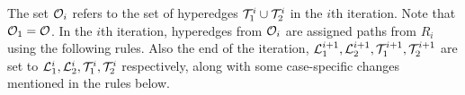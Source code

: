 % 


The set ${\cal O}_i$ refers to the set of hyperedges ${\cal T}_1^i \cup {\cal T}_2^i$
in the $i$th iteration.  Note that ${\cal O}_1 = {\cal O}$.  In the $i$th
iteration, hyperedges from ${\cal O}_i$ are assigned paths from $R_i$ using
the following rules. Also the end of the iteration, ${\cal L}_1^{i+1},
{\cal L}_2^{i+1}, {\cal T}_1^{i+1}, {\cal T}_2^{i+1}$ are set to ${\cal L}_1^{i},
{\cal L}_2^{i}, {\cal T}_1^{i}, {\cal T}_2^{i}$ respectively, along with some
case-specific changes mentioned in the rules below.

